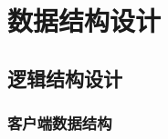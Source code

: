 \chapter{\color{red} 数据结构设计}
{\color{red}
    \section{{\color{red}逻辑结构设计}}

        \subsection{{\color{red}客户端数据结构}}
}        

        

